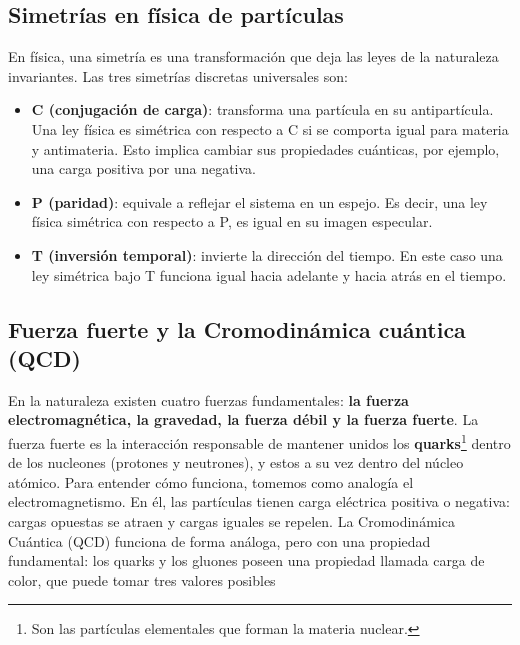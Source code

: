 \subsection{Simetrías en física de partículas}
\label{sec:simetrías-en-fisica-de-particulas}

En física, una simetría es una transformación que deja las leyes de la naturaleza invariantes. Las tres simetrías discretas universales son:
\begin{itemize}
	\item \textbf{C (conjugación de carga)}: transforma una partícula en su antipartícula. Una ley física es simétrica con respecto a C si se comporta igual para materia y antimateria. Esto implica cambiar sus propiedades cuánticas, por ejemplo, una carga positiva por una negativa.
	\item \textbf{P (paridad)}: equivale a reflejar el sistema en un espejo. Es decir, una ley física simétrica con respecto a P, es igual en su imagen especular.
	\item \textbf{T (inversión temporal)}: invierte la dirección del tiempo. En este caso una ley simétrica bajo T funciona igual hacia adelante y hacia atrás en el tiempo.
\end{itemize}


\subsection{Fuerza fuerte y la Cromodinámica cuántica (QCD)}
\label{sec:fuerza-fuerte-cromodinamica-cuantica}

En la naturaleza existen cuatro fuerzas fundamentales: \textbf{la fuerza electromagnética, la gravedad, la fuerza débil y la fuerza fuerte}. La fuerza fuerte es la interacción responsable de mantener unidos los \textbf{quarks}\footnote{Son las partículas elementales que forman la materia nuclear.} dentro de los nucleones (protones y neutrones), y estos a su vez dentro del núcleo atómico.
Para entender cómo funciona, tomemos como analogía el electromagnetismo. En él, las partículas tienen carga eléctrica positiva o negativa: cargas opuestas se atraen y cargas iguales se repelen. La Cromodinámica Cuántica (QCD) funciona de forma análoga, pero con una propiedad fundamental: los quarks y los gluones poseen una propiedad llamada carga de color, que puede tomar tres valores posibles

